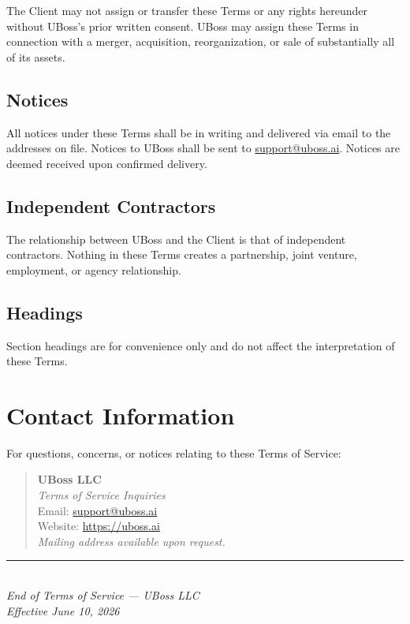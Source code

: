 \documentclass[11pt,letterpaper,parskip=half]{scrartcl}
\begin{document}
The Client may not assign or transfer these Terms or any rights hereunder without UBoss's prior written consent. UBoss may assign these Terms in connection with a merger, acquisition, reorganization, or sale of substantially all of its assets.

\subsection{Notices}

All notices under these Terms shall be in writing and delivered via email to the addresses on file. Notices to UBoss shall be sent to \href{mailto:support@uboss.ai}{support@uboss.ai}. Notices are deemed received upon confirmed delivery.

\subsection{Independent Contractors}

The relationship between UBoss and the Client is that of independent contractors. Nothing in these Terms creates a partnership, joint venture, employment, or agency relationship.

\subsection{Headings}

Section headings are for convenience only and do not affect the interpretation of these Terms.

\section{Contact Information}
\label{sec:contact}

For questions, concerns, or notices relating to these Terms of Service:

\begin{quote}
    \textbf{UBoss LLC}\\
    \textit{Terms of Service Inquiries}\\[0.5em]
    Email: \href{mailto:support@uboss.ai}{support@uboss.ai}\\
    Website: \href{https://uboss.ai}{https://uboss.ai}\\[0.5em]
    \textit{Mailing address available upon request.}
\end{quote}

\vspace{2em}

\begin{center}
    \textcolor{ruleline}{\rule{0.4\textwidth}{0.4pt}}\\[1em]
    {\color{accent}\textit{End of Terms of Service --- UBoss LLC}}\\
    {\color{accent}\textit{Effective June 10, 2026}}
\end{center}
\end{document}
